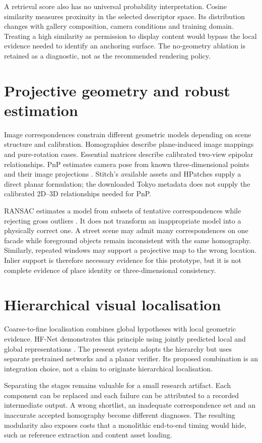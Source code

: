 A retrieval score also has no universal probability interpretation. Cosine similarity measures proximity in the selected descriptor space. Its distribution changes with gallery composition, camera conditions and training domain. Treating a high similarity as permission to display content would bypass the local evidence needed to identify an anchoring surface. The no-geometry ablation is retained as a diagnostic, not as the recommended rendering policy.

\section{Projective geometry and robust estimation}
Image correspondences constrain different geometric models depending on scene structure and calibration. Homographies describe plane-induced image mappings and pure-rotation cases. Essential matrices describe calibrated two-view epipolar relationships. PnP estimates camera pose from known three-dimensional points and their image projections \citep{hartley2004,lepetit2009}. Stitch's available assets and HPatches supply a direct planar formulation; the downloaded Tokyo metadata does not supply the calibrated 2D--3D relationships needed for PnP.

RANSAC estimates a model from subsets of tentative correspondences while rejecting gross outliers \citep{fischler1981}. It does not transform an inappropriate model into a physically correct one. A street scene may admit many correspondences on one facade while foreground objects remain inconsistent with the same homography. Similarly, repeated windows may support a projective map to the wrong location. Inlier support is therefore necessary evidence for this prototype, but it is not complete evidence of place identity or three-dimensional consistency.

\section{Hierarchical visual localisation}
Coarse-to-fine localisation combines global hypotheses with local geometric evidence. HF-Net demonstrates this principle using jointly predicted local and global representations \citep{sarlin2019}. The present system adopts the hierarchy but uses separate pretrained networks and a planar verifier. Its proposed combination is an integration choice, not a claim to originate hierarchical localisation.

Separating the stages remains valuable for a small research artifact. Each component can be replaced and each failure can be attributed to a recorded intermediate output. A wrong shortlist, an inadequate correspondence set and an inaccurate accepted homography become different diagnoses. The resulting modularity also exposes costs that a monolithic end-to-end timing would hide, such as reference extraction and content asset loading.

